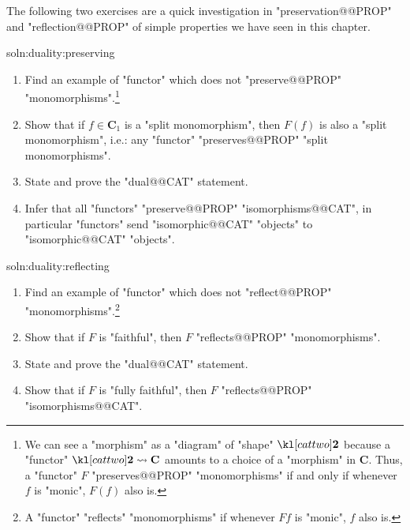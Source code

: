\documentclass[main.tex]{subfiles}
\begin{document}
The following two exercises are a quick investigation in "preservation@@PROP" and "reflection@@PROP" of simple properties we have seen in this chapter.
\begin{exer}{soln:duality:preserving}\label{exer:duality:preserving}
	\begin{enumerate}
        \item Find an example of "functor" which does not "preserve@@PROP" "monomorphisms".\footnote{We can see a "morphism" as a "diagram" of "shape" $\cattwo$ because a "functor" $\cattwo \rightsquigarrow \mathbf{C}$ amounts to a choice of a "morphism" in $\mathbf{C}$. Thus, a "functor" $F$ "preserves@@PROP" "monomorphisms" if and only if whenever $f$ is "monic", $F(f)$ also is.}
        \item Show that if $f \in \mathbf{C}_1$ is a "split monomorphism", then $F(f)$ is also a "split monomorphism", i.e.: any "functor" "preserves@@PROP" "split monomorphisms".
        \item State and prove the "dual@@CAT" statement.
        \item\label{exer:duality:funcpreservesiso} Infer that all "functors" "preserve@@PROP" "isomorphisms@@CAT", in particular "functors" send "isomorphic@@CAT" "objects" to "isomorphic@@CAT" "objects".
    \end{enumerate}
\end{exer}
\begin{exer}{soln:duality:reflecting}\label{exer:duality:reflecting}
	\begin{enumerate}
		\item Find an example of "functor" which does not "reflect@@PROP" "monomorphisms".\footnote{A "functor" "reflects" "monomorphisms" if whenever $Ff$ is "monic", $f$ also is.}
		\item Show that if $F$ is "faithful", then $F$ "reflects@@PROP" "monomorphisms".
		\item State and prove the "dual@@CAT" statement.
		\item Show that if $F$ is "fully faithful", then $F$ "reflects@@PROP" "isomorphisms@@CAT".
	\end{enumerate}
\end{exer}
%
\end{document}
